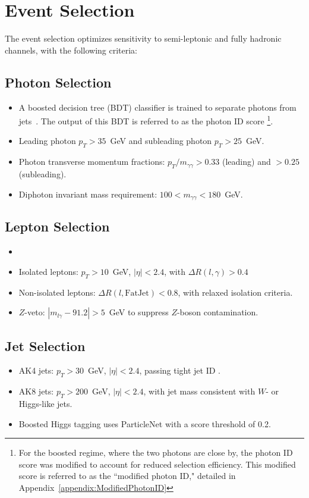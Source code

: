 \section{Event Selection}


The event selection optimizes sensitivity to semi-leptonic and fully hadronic channels, with the following criteria:

\subsection*{Photon Selection}
\begin{itemize}
    \item A boosted decision tree (BDT) classifier is trained to separate photons from jets~\cite{Sirunyan:2018ouh}.
            The output of this BDT is referred to as the photon ID score
            \footnote{For the boosted regime, where the two photons are close by, the photon ID score was modified to
            account for reduced selection efficiency.
            This modified score is referred to as the ``modified photon ID," detailed in
            Appendix~\ref{appendix:ModifiedPhotonID}}.
    \item Leading photon \(p_T > 35\)~GeV and subleading photon \(p_T > 25\)~GeV.
    \item Photon transverse momentum fractions: \(p_T/m_{\gamma\gamma} > 0.33\) (leading) and \(> 0.25\) (subleading).
    \item Diphoton invariant mass requirement: \(100 < m_{\gamma\gamma} < 180\)~GeV.
\end{itemize}


\subsection*{Lepton Selection}
\begin{itemize}
    \item {}
    \item Isolated leptons: \(p_T > 10\)~GeV, \(|\eta| < 2.4\), with \(\Delta R(l,\gamma) > 0.4\)
    \item Non-isolated leptons: \(\Delta R(l, \text{FatJet}) < 0.8\), with relaxed isolation criteria.
    \item \(Z\)-veto: \(|m_{l\gamma} - 91.2| > 5\)~GeV to suppress \(Z\)-boson contamination.
\end{itemize}

\subsection*{Jet Selection}
\begin{itemize}
    \item AK4 jets: \(p_T > 30\)~GeV, \(|\eta| < 2.4\), passing tight jet ID .
    \item AK8 jets: \(p_T > 200\)~GeV, \(|\eta| < 2.4\), with jet mass consistent with \(W\)- or Higgs-like jets.
    \item Boosted Higgs tagging uses ParticleNet  with a score threshold of 0.2.
\end{itemize}

